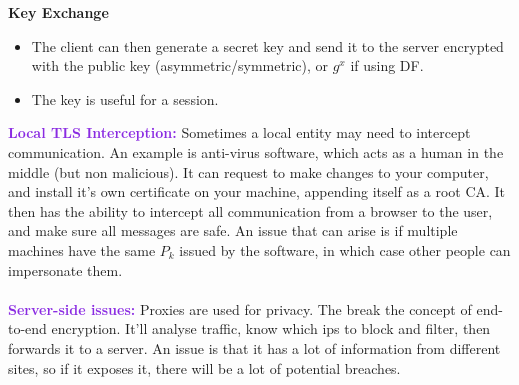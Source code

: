 \documentclass[a4paper,10pt]{article}
\begin{document}
\textbf{Key Exchange}
\begin{itemize}
\item The client can then generate a secret key and send it to the server encrypted with the public key (asymmetric/symmetric), or $g^{x}$ if using DF. 
\item The key is useful for a session. 
\end{itemize}
\textcolor{BlueViolet}{\textbf{Local TLS Interception:}} Sometimes a local entity may need to intercept communication. An example is anti-virus software, which acts as a human in the middle (but non malicious). It can request to make changes to your computer, and install it's own certificate on your machine, appending itself as a root CA. It then has the ability to intercept all communication from a browser to the user, and make sure all messages are safe. An issue that can arise is if multiple machines have the same $P_k$ issued by the software, in which case other people can impersonate them. \\\\ 
\textcolor{BlueViolet}{\textbf{Server-side issues:}} Proxies are used for privacy. The break the concept of end-to-end encryption. It'll analyse traffic, know which ips to block and filter, then forwards it to a server. An issue is that it has a lot of information from different sites, so if it exposes it, there will be a lot of potential breaches. \\\\
\textcolor{BlueViolet}{\textbf{}}
\textcolor{BlueViolet}{\textbf{}}
\textcolor{BlueViolet}{\textbf{}}
\textcolor{BlueViolet}{\textbf{}}
\textcolor{BlueViolet}{\textbf{}}
\textcolor{BlueViolet}{\textbf{}}
\end{document}
